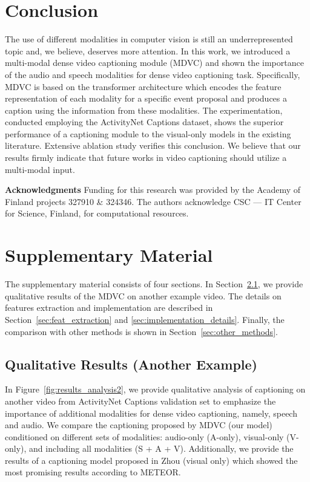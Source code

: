 \documentclass[10pt,twocolumn,letterpaper]{article}
\begin{document}
\section{Conclusion}
The use of different modalities in computer vision is still an underrepresented topic and, we believe, deserves more attention. In this work, we introduced a multi-modal dense video captioning module (MDVC) and shown the importance of the audio and speech modalities for dense video captioning task. Specifically, MDVC is based on the transformer architecture which encodes the feature representation of each modality for a specific event proposal and produces a caption using the information from these modalities. The experimentation, conducted employing the ActivityNet Captions dataset, shows the superior performance of a captioning module to the visual-only models in the existing literature. Extensive ablation study verifies this conclusion. We believe that our results firmly indicate that future works in video captioning should utilize a multi-modal input.

{\footnotesize\noindent \textbf{Acknowledgments} Funding for this research was provided by the Academy of Finland projects 327910 \& 324346. The authors acknowledge CSC --- IT Center for Science, Finland, for computational resources.}

{\small


}

\clearpage

\section{Supplementary Material}
The supplementary material consists of four sections. In Section~\ref{sec:another_example}, we provide qualitative results of the MDVC on another example video. The details on features extraction and implementation are described in Section~\ref{sec:feat_extraction} and \ref{sec:implementation_details}. Finally, the comparison with other methods is shown in Section~\ref{sec:other_methods}.

\subsection{Qualitative Results (Another Example)} \label{sec:another_example}
In Figure~\ref{fig:results_analysis2}, we provide qualitative analysis of captioning on another video from ActivityNet Captions validation set to emphasize the importance of additional modalities for dense video captioning, namely, speech and audio. We compare the captioning proposed by MDVC (our model) conditioned on different sets of modalities: audio-only (A-only), visual-only (V-only), and including all modalities (S + A + V). Additionally, we provide the results of a captioning model proposed in Zhou \etal \cite{Zhou2018} (visual only) which showed the most promising results according to METEOR.
\end{document}
